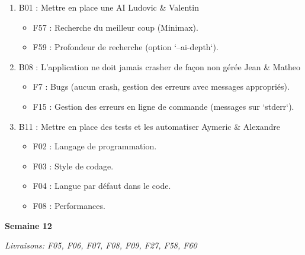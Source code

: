 \documentclass[a4paper,12pt]{article}
\begin{document}
\begin{enumerate}
  \item B01 : Mettre en place une AI\newline
  Ludovic \& Valentin
  \begin{itemize}
    \item F57 : Recherche du meilleur coup (Minimax).
    \item F59 : Profondeur de recherche (option `--ai-depth`).
  \end{itemize}
  \item B08 : L’application ne doit jamais crasher de façon non gérée
  Jean \& Matheo
  \begin{itemize}
    \item F7 : Bugs (aucun crash, gestion des erreurs avec messages appropriés).
    \item F15 : Gestion des erreurs en ligne de commande (messages sur `stderr`).
  \end{itemize}
  \item B11 : Mettre en place des tests et les automatiser
  Aymeric \& Alexandre
  \begin{itemize}
    \item F02 : Langage de programmation.
    \item F03 : Style de codage.
    \item F04 : Langue par défaut dans le code.
    \item F08 : Performances.\newline
  \end{itemize}
\end{enumerate}

\textbf{\large{Semaine 12}}

\textit{Livraisons: F05, F06, F07, F08, F09, F27, F58, F60}
\end{document}
